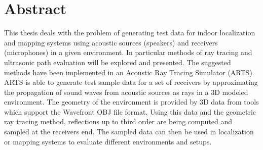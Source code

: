 \chapter*{Abstract}
This thesis deals with the problem of generating test data for indoor localization and mapping systems using acoustic sources (speakers) and receivers (microphones) in a given environment.
In particular methods of ray tracing and ultrasonic path evaluation will be explored and presented.
The suggested methods have been implemented in an Acoustic Ray Tracing Simulator (ARTS).
\newline ARTS is able to generate test sample data for a set of receivers by approximating the propagation of sound waves from acoustic sources as rays in a 3D modeled environment.
The geometry of the environment is provided by 3D data from tools which support the Wavefront OBJ file format.
Using this data and the geometric ray tracing method, reflections up to third order are being computed and sampled at the receivers end.
The sampled data can then be used in localization or mapping systems to evaluate different environments and setups.
